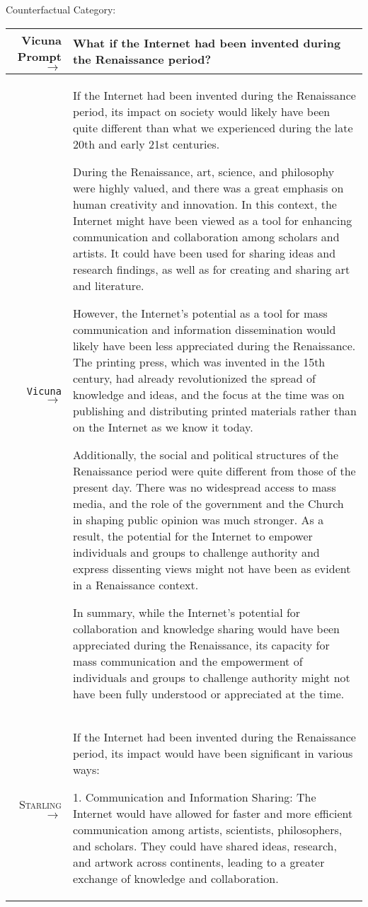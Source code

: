 \documentclass{article}
\newlength\mydepth
\newcommand{\starlingemojititle}{\textsc{Starling}\raisebox{-\mydepth}{\texttt{[image: images/starling-final.png]}}}
\begin{document}
{Counterfactual Category:

{  \footnotesize \begin{tabularx}{\linewidth}{r X} \toprule Vicuna Prompt $\to$ & {\bf What if the Internet had been invented during the Renaissance period?}
\\
 \midrule \texttt{Vicuna} $\to$ &
If the Internet had been invented during the Renaissance period, its impact on society would likely have been quite different than what we experienced during the late 20th and early 21st centuries.

During the Renaissance, art, science, and philosophy were highly valued, and there was a great emphasis on human creativity and innovation. In this context, the Internet might have been viewed as a tool for enhancing communication and collaboration among scholars and artists. It could have been used for sharing ideas and research findings, as well as for creating and sharing art and literature.

However, the Internet's potential as a tool for mass communication and information dissemination would likely have been less appreciated during the Renaissance. The printing press, which was invented in the 15th century, had already revolutionized the spread of knowledge and ideas, and the focus at the time was on publishing and distributing printed materials rather than on the Internet as we know it today.

Additionally, the social and political structures of the Renaissance period were quite different from those of the present day. There was no widespread access to mass media, and the role of the government and the Church in shaping public opinion was much stronger. As a result, the potential for the Internet to empower individuals and groups to challenge authority and express dissenting views might not have been as evident in a Renaissance context.

In summary, while the Internet's potential for collaboration and knowledge sharing would have been appreciated during the Renaissance, its capacity for mass communication and the empowerment of individuals and groups to challenge authority might not have been fully understood or appreciated at the time.
\\
 \midrule \starlingemojititle{} $\to$ &
If the Internet had been invented during the Renaissance period, its impact would have been significant in various ways:

1. Communication and Information Sharing: The Internet would have allowed for faster and more efficient communication among artists, scientists, philosophers, and scholars. They could have shared ideas, research, and artwork across continents, leading to a greater exchange of knowledge and collaboration.


\end{tabularx}}}
\end{document}
